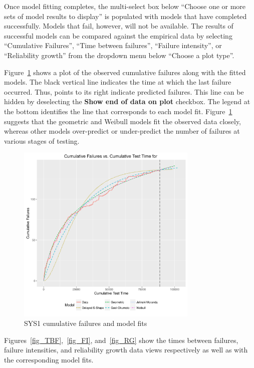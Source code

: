 \documentclass[conference]{IEEEtran}
\begin{document}
Once model fitting completes, the multi-select box below ``Choose one or more sets of model results to display'' is populated with models that have completed successfully. Models that fail, however, will not be available. The results of successful models can be compared against the empirical data by selecting ``Cumulative Failures'', ``Time between failures'', ``Failure intensity'', or ``Reliability growth'' from the dropdown menu below ``Choose a plot type''.

Figure~\ref{fig_SYS1_Cum} shows a plot of the observed cumulative failures along with the fitted models. The black vertical line indicates the time at which the last failure occurred. Thus, points to its right indicate predicted failures. This line can be hidden by deselecting the \textbf{Show end of data on plot} checkbox. The legend at the bottom identifies the line that corresponds to each model fit. Figure~\ref{fig_SYS1_Cum} suggests that the geometric and Weibull models fit the observed data closely, whereas other models over-predict or under-predict the number of failures at various stages of testing.

\begin{figure}[!h]
\centering
\includegraphics[width=3.4in]{Figures/SRT6}
\caption{SYS1 cumulative failures and model fits}
\label{fig_SYS1_Cum}
\end{figure}


Figures~\ref{fig_TBF},~\ref{fig_FI}, and~\ref{fig_RG} show the times between failures, failure intensities, and reliability growth data views respectively as well as with the corresponding model fits.
\end{document}
